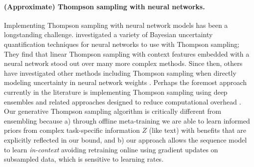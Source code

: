 \paragraph{(Approximate) Thompson sampling with neural networks.}
Implementing Thompson sampling with neural network models has been a longstanding challenge. \citet{riquelme2018deep} investigated a variety of Bayesian uncertainty quantification techniques for neural networks to use with Thompson sampling; They find that linear Thompson sampling with context features embedded with a neural network stood out over many more complex methods. Since then, others have investigated other methods including Thompson sampling when directly modeling uncertainty in neural network weights \citep{zhang2020neural,local-uncertainty}. Perhaps the foremost approach currently in the literature is implementing Thompson sampling using deep ensembles and related approaches designed to reduce computational overhead \citep{ensembleSampling,lu2017ensemble,dwaracherla2020hypermodels,osband2023approximate,osband2015bootstrapped,osband2023approximate,li2024ensemble++,li2024hyperagent}. Our generative Thompson sampling algorithm is critically different from ensembling because a) through offline meta-training we are able to learn informed priors from complex task-specific information $Z$ (like text) with benefits that are explicitly reflected in our bound, and b) our approach allows the sequence model to learn \textit{in-context} avoiding retraining online using gradient updates on subsampled data, which is sensitive to learning rates.